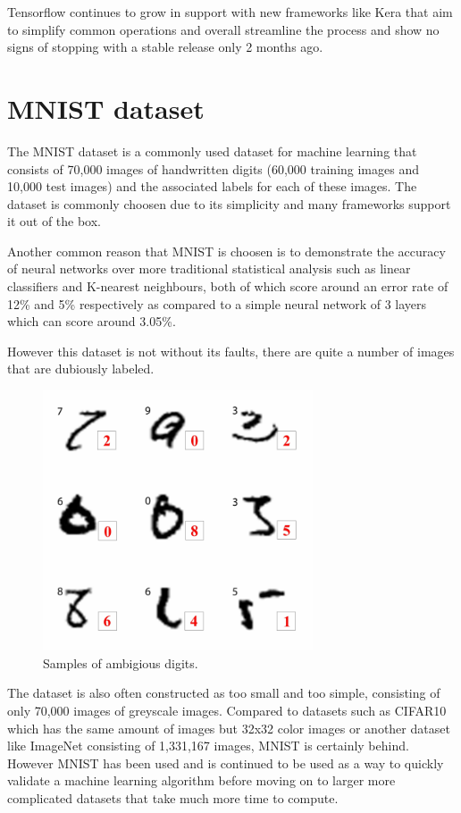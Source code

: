 \documentclass[a4paper,twoside,phd]{BYUPhys}
\begin{document}
Tensorflow continues to grow in support with new frameworks like Kera that aim to simplify common operations and overall streamline the process and show no signs of stopping with a stable release only 2 months ago.

\section{MNIST dataset}
The MNIST dataset is a commonly used dataset for machine learning that consists of 70,000 images of handwritten digits (60,000 training images and 10,000 test images) and the associated labels for each of these images. The dataset is commonly choosen due to its simplicity and many frameworks support it out of the box.

Another common reason that MNIST is choosen is to demonstrate the accuracy of neural networks over more traditional statistical analysis such as linear classifiers and K-nearest neighbours, both of which score around an error rate of 12\% and 5\% respectively\cite{lecun-98} as compared to a simple neural network of 3 layers which can score around 3.05\%\cite{lecun-98}.

However this dataset is not without its faults, there are quite a number of images that are dubiously labeled.
\begin{figure}[H]
\centering
\includegraphics[width=8cm]{pictures/mnist_incorrect.png}
\caption{Samples of ambigious digits.}
\label{fig:incorrect_mnist}
\end{figure}
The dataset is also often constructed as too small and too simple, consisting of only 70,000 images of greyscale images. Compared to datasets such as CIFAR10 which has the same amount of images but 32x32 color images or another dataset like ImageNet consisting of 1,331,167 images, MNIST is certainly behind. However MNIST has been used and is continued to be used as a way to quickly validate a machine learning algorithm before moving on to larger more complicated datasets that take much more time to compute.
\end{document}
